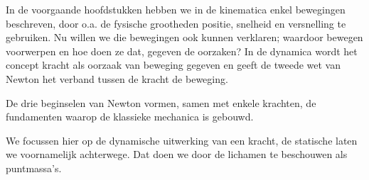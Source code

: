 \documentclass{ximera}
\begin{document}
	\author{Bart Lambregs}
    \xmsource\xmuitleg


In de voorgaande hoofdstukken hebben we in de kinematica enkel bewegingen beschreven, door o.a. de fysische grootheden positie, snelheid en versnelling te gebruiken. Nu willen we die bewegingen ook kunnen verklaren; waardoor bewegen voorwerpen en hoe doen ze dat, gegeven de oorzaken? In de dynamica wordt het concept kracht als oorzaak van beweging gegeven en geeft de tweede wet van Newton het verband tussen de kracht de beweging.

De drie beginselen van Newton vormen, samen met enkele krachten, de fundamenten waarop de klassieke mechanica is gebouwd.

We focussen hier op de dynamische uitwerking van een kracht, de statische laten we voornamelijk achterwege. Dat doen we door de lichamen te beschouwen als puntmassa's.
\end{document}

